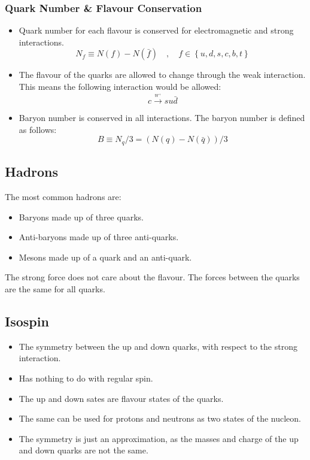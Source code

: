 \subsubsection{Quark Number \& Flavour Conservation}
\begin{itemize}
    \item Quark number for each flavour is conserved for electromagnetic and strong interactions. 
    \begin{equation}
      N_f ≡ N(f) - N(\bar{f}) \quad , \quad  f ∈ \left\{u, d, s, c, b, t\right\}
    \end{equation} 
    \item The flavour of the quarks are allowed to change through the weak interaction. This means the following interaction would be allowed:
    \begin{equation}
      c \overset{\underset{W^{+}}{}}{→} s u \bar{d} 
    \end{equation} 
    \item Baryon number is conserved in all interactions. The baryon number is defined as follows:
    \begin{equation}
      B ≡ N_q / 3 = \left(N(q) - N(\bar{q})\right) / 3
    \end{equation}
\end{itemize}

\subsection{Hadrons}
The most common hadrons are:
\begin{itemize}
    \item Baryons made up of three quarks. 
    \item Anti-baryons made up of three anti-quarks.
    \item Mesons made up of a quark and an anti-quark.
\end{itemize}

The strong force does not care about the flavour. The forces between the quarks are the same for all quarks. 

\subsection{Isospin}
\begin{itemize}
    \item The symmetry between the up and down quarks, with respect to the strong interaction. 
    \item Has nothing to do with regular spin. 
    \item The up and down sates are flavour states of the quarks. 
    \item The same can be used for protons and neutrons as two states of the nucleon. 
    \item The symmetry is just an approximation, as the masses and charge of the up and down quarks are not the same.
\end{itemize}

